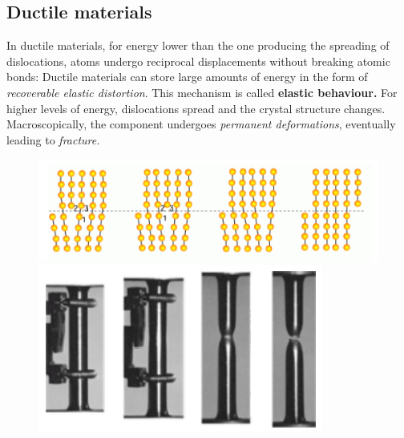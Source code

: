 \documentclass[class=report, crop=false, 12pt,a4paper]{standalone}
\begin{document}
\subsection{Ductile materials}
In ductile materials, for energy lower than the one producing the spreading of dislocations, atoms undergo reciprocal displacements without breaking atomic bonds: Ductile materials can store large amounts of energy in the form of \textit{recoverable elastic distortion}. This mechanism is called \textbf{elastic behaviour.} For higher levels of energy, dislocations spread and the crystal structure changes. Macroscopically, the component undergoes \textit{permanent deformations}, eventually leading to \textit{fracture.}
\begin{figure}
  \begin{center}
    \begin{minipage}[b]{0.46\textwidth}
      \centering
      \includegraphics[width = \textwidth]{../img/diagram10.png}
      \caption{}
    \end{minipage}
    \begin{minipage}[b]{0.46\textwidth}
      \centering
      \includegraphics[width = \textwidth]{../img/diagram11.png}
      \caption{}
    \end{minipage}
  \end{center}
\end{figure}
\end{document}

